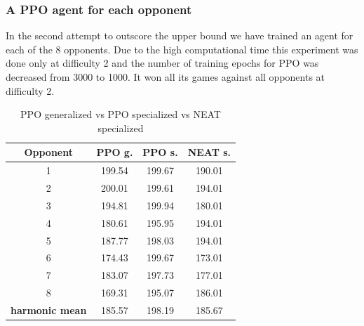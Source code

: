 \documentclass[conference]{IEEEtran}
\begin{document}
    \subsubsection{A PPO agent for each opponent}
    In the second attempt to outscore the upper bound we have trained an agent
    for each of the $8$ opponents.
    Due to the high computational time this experiment was done only at
    difficulty 2 and the number of training epochs for PPO was decreased from 3000 to 1000.
    It won all its games against all opponents at difficulty 2.
    \begin{table}[htbp]
        \caption{PPO generalized vs PPO specialized vs NEAT specialized}
        \begin{center}
            \begin{tabular}{|c|c|c|c|}
                \hline
                \textbf{Opponent}&\textbf{PPO g.}&\textbf{PPO s.}&\textbf{NEAT s.} \\
                \hline
                 1 &  199.54 &  199.67 &  190.01 \\
                 2 &  200.01 &  199.61 &  194.01 \\
                 3 &  194.81 &  199.94 &  180.01 \\
                 4 &  180.61 &  195.95 &  194.01 \\
                 5 &  187.77 &  198.03 &  194.01 \\
                 6 &  174.43 &  199.67 &  173.01 \\
                 7 &  183.07 &  197.73 &  177.01 \\
                 8 &  169.31 &  195.07 &  186.01 \\
                \hline
                \textbf{harmonic mean} & 185.57 & 198.19 & 185.67 \\
                \hline
            \end{tabular}
            \label{PPO generalized vs specialized vs NEAT}
        \end{center}
    \end{table}
\end{document}
